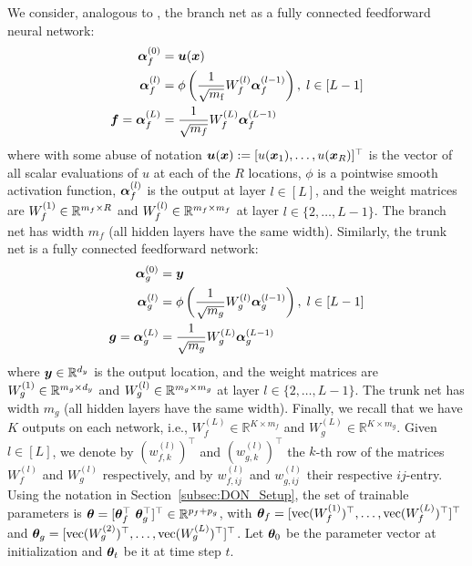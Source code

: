We consider, analogous to \citep{liu_loss_2021}, the branch net as a fully connected feedforward neural network:
\begin{align}
    \begin{aligned}
        \boldsymbol{\alpha}^{(0)}_{f} &= \boldsymbol{u}({\bm{x}}) \\
        \boldsymbol{\alpha}^{(l)}_{f} &= \phi\left( \frac{1}{\sqrt{m_{{\textnormal{f}}}}} W^{(l)}_f\boldsymbol{\alpha}^{(l-1)}_{f}  \right),\; l \in [L-1]\\ 
        {\bm{f}} =  \boldsymbol{\alpha}^{(L)}_{f} &= 
        \frac{1}{\sqrt{m_{f}}} W_f^{(L)}\boldsymbol{\alpha}^{(L-1)}_f
    \end{aligned}
    \label{eq:BranchNetRegularized}
\end{align}
where with some abuse of notation $\boldsymbol{u}({\bm{x}}):=[u({\bm{x}}_1),\dots,u({\bm{x}}_R)]^\top$ is the vector of all scalar evaluations of $u$ at each of the $R$ locations, $\phi$ is a pointwise smooth activation function, $\boldsymbol{\alpha}^{(l)}_f$ is the output at layer $l\in[L]$, and the weight matrices are $W^{(1)}_f\in{\mathbb{R}}^{m_f\times R}$ and $W^{(l)}_f \in {\mathbb{R}}^{m_f\times m_f}$ at layer $l\in\{2,\dots,L-1\}$. The branch net has width $m_f$ (all hidden layers have the same width). %
%
Similarly, the trunk net is a fully connected feedforward network:
\begin{align}
    \begin{aligned}
        \boldsymbol{\alpha}^{(0)}_{g} &= {\bm{y}}\\
        \boldsymbol{\alpha}^{(l)}_{g} &= \phi\left( \frac{1}{\sqrt{m_{g}}} W^{(l)}_g \boldsymbol{\alpha}^{(l-1)}_{g}  \right),\; l \in [L-1]\\ 
        {\bm{g}} = \boldsymbol{\alpha}^{(L)}_{g} &= 
        \frac{1}{\sqrt{m_{g}}} W_g^{(L)}\boldsymbol{\alpha}^{(L - 1)}_{g}
    \end{aligned}
    \label{eq:TrunkNetRegularized}
\end{align}
where ${\bm{y}}\in{\mathbb{R}}^{d_y}$ is the output location, and the weight matrices are $W^{(1)}_g\in{\mathbb{R}}^{m_g\times d_y}$ and $W^{(l)}_g\in {\mathbb{R}}^{m_g\times m_g}$ at layer $l\in\{2,\dots,L-1\}$. The trunk net 
has width $m_g$
(all hidden layers have the same width).
Finally, we recall that we have $K$ outputs on each network, i.e., $W^{(L)}_f\in\mathbb{R}^{K\times m_f}$ and $W^{(L)}_g\in\mathbb{R}^{K\times m_g}$.
% 
Given $l\in[L]$, we denote by $(w^{(l)}_{f,{k}})^\top$ and $(w^{(l)}_{g,{k}})^\top$ the $k$-th row of the matrices $W^{(l)}_f$ and $W^{(l)}_g$ respectively, and by $w_{f,{ij}}^{(l)}$ and $w_{g,{ij}}^{(l)}$ their respective $ij$-entry. 
%
%
Using the notation in Section~\ref{subsec:DON_Setup}, the set of trainable parameters is ${\bm{\theta}} = [{\bm{\theta}}_f^{\top}\
{\bm{\theta}}_g^{\top}]^{\top}\in{\mathbb{R}}^{p_f+p_g}$, with ${\bm{\theta}}_f = [\text{vec}(W^{(1)}_f)^{\top},\dots,\text{vec}(W^{(L)}_f)^{\top}]^{\top}$ and ${\bm{\theta}}_g = [\text{vec}(W^{(2)}_g)^\top,\dots,\text{vec}(W^{(L)}_g)^{\top}]^{\top}$. 
Let ${\bm{\theta}}_0$ be the parameter vector at initialization and ${\bm{\theta}}_t$ be it at time step $t$. 

